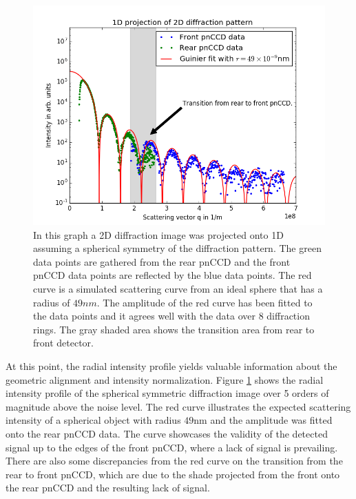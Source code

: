 \begin{figure}
	\centering
		\includegraphics[height=0.50\textwidth]{images/pnCCD-1d-sum.png}
	\caption{In this graph a 2D diffraction image was projected onto 1D assuming a spherical symmetry of the diffraction pattern. The green data points are gathered from the rear pnCCD and the front pnCCD data points are reflected by the blue data points. The red curve is a simulated scattering curve from an ideal sphere that has a radius of $49 nm$. The amplitude of the red curve has been fitted to the data points and it agrees well with the data over 8 diffraction rings. The gray shaded area shows the transition area from rear to front detector.}
	\label{fig:pnCCD-1d-sum}
\end{figure}
At this point, the radial intensity profile yields valuable information about the geometric alignment and intensity normalization. Figure \ref{fig:pnCCD-1d-sum} shows the radial intensity profile of the spherical symmetric diffraction image over 5 orders of magnitude above the noise level. The red curve illustrates the expected scattering intensity of a spherical object with radius $49$nm and the amplitude was fitted onto the rear pnCCD data. The curve showcases the validity of the detected signal up to the edges of the front pnCCD, where a lack of signal is prevailing. There are also some discrepancies from the red curve on the transition from the rear to front pnCCD, which are due to the shade projected from the front onto the rear pnCCD and the resulting lack of signal.
%
%
%
